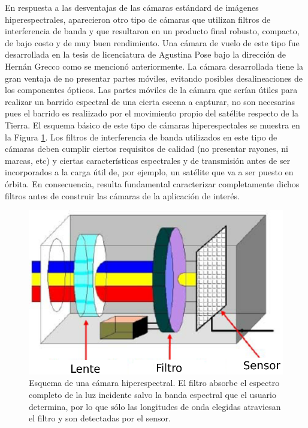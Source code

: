 En respuesta a las desventajas de las cámaras estándard de imágenes 
hiperespectrales, aparecieron otro tipo de cámaras que utilizan filtros de 
interferencia de banda y que resultaron en un producto final robusto, compacto, 
de bajo costo y de muy buen rendimiento. Una cámara de vuelo 
de este tipo fue desarrollada en la tesis de licenciatura de Agustina Pose bajo 
la dirección de Hernán Grecco \cite{Pose2017} como se mencionó anteriormente. 
La cámara desarrollada tiene la gran ventaja de no presentar partes móviles, 
evitando posibles desalineaciones de los componentes ópticos. Las partes 
móviles de la cámara que serían útiles para realizar un barrido espectral de 
una cierta escena a capturar, no son necesarias pues el barrido es realiizado 
por el movimiento propio del satélite respecto de la Tierra. El esquema básico 
de este tipo de 
cámaras hiperespectales se muestra 
en la Figura \ref{fig:camsens}. Los filtros de interferencia de banda 
utilizados en este tipo de cámaras deben cumplir ciertos requisitos de calidad 
(no presentar rayones, ni marcas, etc) 
y ciertas características espectrales y de transmisión antes de ser 
incorporados a la carga útil de, por ejemplo, un satélite que va a ser puesto 
en 
órbita. En consecuencia, resulta fundamental caracterizar completamente dichos 
filtros antes de construir las cámaras de la aplicación de interés.

\begin{figure}[H]
	\centering
	\includegraphics[scale=0.535]{Figs/plan_de_tesis/cam_sens.png}
	\caption{ Esquema de una cámara hiperespectral. El filtro absorbe el 
	espectro completo de la luz incidente salvo la banda espectral que el 
	usuario determina, por lo que sólo las longitudes de onda elegidas 
	atraviesan el filtro y son detectadas por el sensor. \cite{Martinez2008}}
	\label{fig:camsens}
\end{figure}



